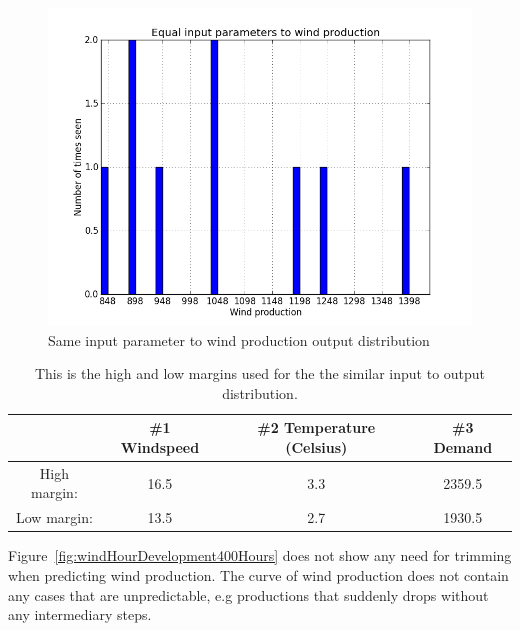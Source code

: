 \begin{figure}[H]
\centering
\includegraphics[width=0.99\linewidth,natwidth=898,natheight=587]{billeder/Equal_wind.png}
\caption{Same input parameter to wind production output distribution}
\label{fig:inputParameterDistribution}
\end{figure}

\begin{table}[H]
\centering  %
\begin{tabular}{c c c c} %
 & \#1 Windspeed & \#2 Temperature (Celsius) & \#3 Demand \\ [0.5ex] %
\hline                  %
High margin: & 16.5 & 3.3 & 2359.5  \\
Low margin: & 13.5 & 2.7 & 1930.5 \\ [1ex] %
\hline %
\end{tabular}
\caption{This is the high and low margins used for the the similar input to output distribution.} %
\label{table:similarHoursLimitsWindProd} %
\end{table}

Figure~\ref{fig:windHourDevelopment400Hours} does not show any need for trimming when predicting wind production. The curve of wind production does not contain any cases that are unpredictable, e.g productions that suddenly drops without any intermediary steps. 

